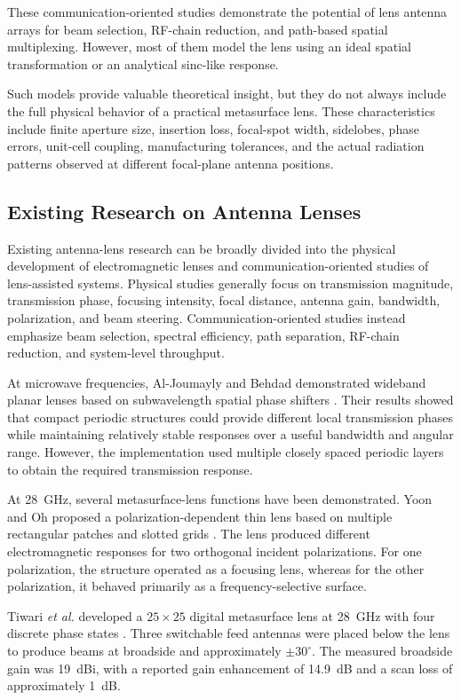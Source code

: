 These communication-oriented studies demonstrate the potential of
lens antenna arrays for beam selection, RF-chain reduction, and
path-based spatial multiplexing. However, most of
them model the lens using an ideal spatial transformation or an
analytical sinc-like response.

Such models provide valuable theoretical insight, but they do not
always include the full physical behavior of a practical
metasurface lens. These characteristics include finite aperture size,
insertion loss, focal-spot width, sidelobes, phase errors, unit-cell
coupling, manufacturing tolerances, and the actual radiation patterns
observed at different focal-plane antenna positions.


\subsection{Existing Research on Antenna Lenses}
\label{subsec:existing_antenna_lens_research}

Existing antenna-lens research can be broadly divided into the
physical development of electromagnetic lenses and
communication-oriented studies of lens-assisted systems. Physical
studies generally focus on
transmission magnitude, transmission phase, focusing intensity, focal
distance, antenna gain, bandwidth, polarization, and beam steering.
Communication-oriented studies instead emphasize beam selection,
spectral efficiency, path separation, RF-chain reduction, and
system-level throughput.

At microwave frequencies, Al-Joumayly and Behdad demonstrated
wideband planar lenses based on subwavelength spatial phase shifters
\cite{Al-Joumayly2011}. Their results showed that compact
periodic structures could provide different local transmission phases
while maintaining relatively stable responses over a useful bandwidth
and angular range. However, the implementation used multiple closely
spaced periodic layers to obtain the required transmission response.

At 28~GHz, several metasurface-lens functions have been demonstrated.
Yoon and Oh proposed a polarization-dependent thin lens based on
multiple rectangular patches and slotted grids
\cite{Yoon2019}. The lens produced different
electromagnetic responses for two orthogonal incident polarizations.
For one polarization, the structure operated as a focusing lens,
whereas for the other polarization, it behaved primarily as a
frequency-selective surface.

Tiwari \textit{et al.} developed a $25\times25$ digital metasurface
lens at 28~GHz with four discrete phase states
\cite{Tiwari2023}. Three switchable feed antennas were placed
below the lens to produce beams at broadside and approximately
$\pm30^{\circ}$. The measured broadside gain was 19~dBi, with a
reported gain enhancement of 14.9~dB and a scan loss of approximately
1~dB.

